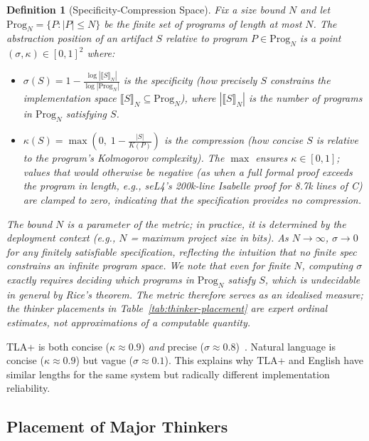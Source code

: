 \documentclass[11pt, a4paper, copyright]{googledeepmind}
\newtheorem{definition}{Definition}[section]
\begin{document}
\begin{definition}[Specificity-Compression Space]
Fix a size bound $N$ and let $\text{Prog}_N = \{P : |P| \leq N\}$ be the finite set of programs of length at most $N$. The \emph{abstraction position} of an artifact $S$ relative to program $P \in \text{Prog}_N$ is a point $(\sigma, \kappa) \in [0,1]^2$ where:
\begin{itemize}
    \item $\sigma(S) = 1 - \frac{\log |\llbracket S \rrbracket_N|}{\log |\text{Prog}_N|}$ is the \emph{specificity} (how precisely $S$ constrains the implementation space $\llbracket S \rrbracket_N \subseteq \text{Prog}_N$), where $|\llbracket S \rrbracket_N|$ is the number of programs in $\text{Prog}_N$ satisfying $S$.
    \item $\kappa(S) = \max\!\left(0,\; 1 - \frac{|S|}{K(P)}\right)$ is the \emph{compression} (how concise $S$ is relative to the program's Kolmogorov complexity). The $\max$ ensures $\kappa \in [0,1]$; values that would otherwise be negative (as when a full formal proof exceeds the program in length, e.g., seL4's 200k-line Isabelle proof for 8.7k lines of C) are clamped to zero, indicating that the specification provides no compression.
\end{itemize}
The bound $N$ is a parameter of the metric; in practice, it is determined by the deployment context (e.g., $N$ = maximum project size in bits). As $N \to \infty$, $\sigma \to 0$ for any finitely satisfiable specification, reflecting the intuition that no finite spec constrains an infinite program space. We note that even for finite $N$, computing $\sigma$ exactly requires deciding which programs in $\text{Prog}_N$ satisfy $S$, which is undecidable in general by Rice's theorem. The metric therefore serves as an idealised measure; the thinker placements in Table~\ref{tab:thinker-placement} are expert ordinal estimates, not approximations of a computable quantity.
\end{definition}

TLA+ is both concise ($\kappa \approx 0.9$) \emph{and} precise ($\sigma \approx 0.8$)~\citep{newcombe2015amazon}. Natural language is concise ($\kappa \approx 0.9$) but vague ($\sigma \approx 0.1$). This explains why TLA+ and English have similar lengths for the same system but radically different implementation reliability.

\subsection{Placement of Major Thinkers}
\end{document}
